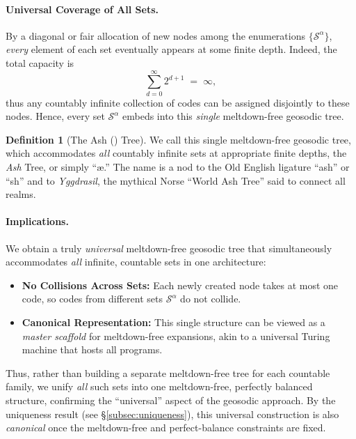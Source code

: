\documentclass[acmsmall]{acmart}
\theoremstyle{definition}
\newtheorem{definition}[theorem]{Definition}
\theoremstyle{remark}
\begin{document}
\paragraph{Universal Coverage of All Sets.}
By a diagonal or fair allocation of new nodes among the enumerations $\{\mathcal{S}^\alpha\}$, 
\emph{every} element of each set eventually appears at some finite depth. 
Indeed, the total capacity is
\[
  \sum_{d=0}^{\infty} 2^{d+1} \;=\; \infty,
\]
thus any countably infinite collection of codes can be assigned disjointly to these nodes. 
Hence, every set $\mathcal{S}^\alpha$ embeds into this \emph{single} meltdown-free geosodic tree.

\begin{definition}[The Ash (\text{\ae}) Tree]
    \label{def:universal-ash}
    We call this single meltdown-free geosodic tree, which accommodates
    \emph{all} countably infinite sets at appropriate finite depths,
    the \emph{Ash} Tree, or simply ``\ae.'' The name is a nod to the 
    Old English ligature “ash” or “\text{\ae}sh” and to \emph{Yggdrasil}, 
    the mythical Norse ``World Ash Tree'' said to connect all realms.
    \end{definition}

\paragraph{Implications.}
We obtain a truly \emph{universal} meltdown-free geosodic tree 
that simultaneously accommodates \emph{all} infinite, countable sets in one architecture:
\begin{itemize}
    \item \textbf{No Collisions Across Sets:} Each newly created node takes at most one code,
    so codes from different sets $\mathcal{S}^\alpha$ do not collide.
    \item \textbf{Canonical Representation:} This single structure 
    can be viewed as a \emph{master scaffold} for meltdown-free expansions, 
    akin to a universal Turing machine that hosts all programs.
\end{itemize}

Thus, rather than building a separate meltdown-free tree for each countable family, 
we unify \emph{all} such sets into one meltdown-free, perfectly balanced structure, 
confirming the “universal” aspect of the geosodic approach. By the uniqueness result (see \S\ref{subsec:uniqueness}), 
this universal construction is also \emph{canonical} once the meltdown-free and
perfect-balance constraints are fixed.
\end{document}
